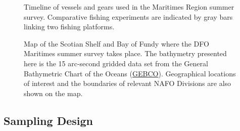 \documentclass[12pt]{article}\usepackage[]{graphicx}\usepackage[]{color}
\begin{document}
\begin{figure}[htb]

{\centering {} 

}

\caption{Timeline of vessels and gears used in the Maritimes Region summer survey. Comparative fishing experiments are indicated by gray bars linking two fishing platforms.}\label{fig:timeline}
\end{figure}

\begin{figure}[htb]

{\centering {} 

}

\caption{Map of the Scotian Shelf and Bay of Fundy where the DFO Maritimes summer survey takes place. The bathymetry presented here is the 15 arc-second gridded data set from the General Bathymetric Chart of the Oceans (\href{https://www.gebco.net/data_and_products/gridded_bathymetry_data/}{GEBCO}). Geographical locations of interest and the boundaries of relevant NAFO Divisions are also shown on the map.}\label{fig:map1}
\end{figure}
\hypertarget{sampling-design}{%
\subsection{Sampling Design}\label{sampling-design}}
\end{document}
